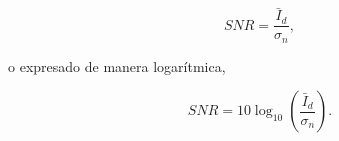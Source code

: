 \begin{equation}
\label{eq:SNR}
	SNR = \frac{\bar{I}_d}{\sigma_n},
\end{equation}

\noindent o expresado de manera logarítmica,

\begin{equation}
	SNR = 10\log_{10}\left( \frac{\bar{I}_d}{\sigma_n}\right).
\end{equation}

%


%
%
%
%
%






